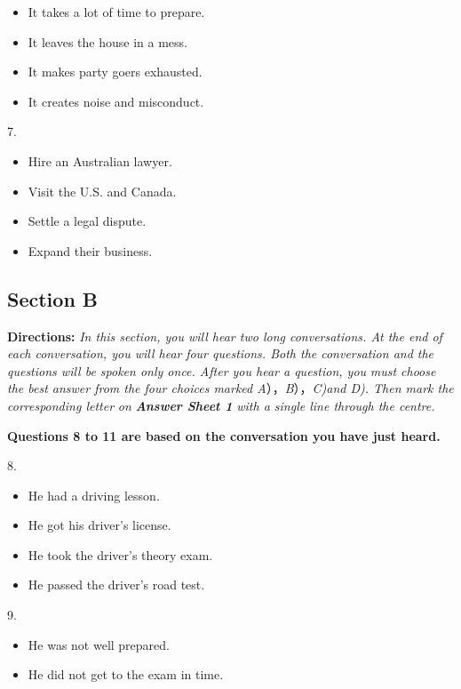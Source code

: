 \documentclass[UTF8,11pt]{ctexart}
\begin{document}
\begin{itemize}[leftmargin=2em,itemsep=.2em,topsep=.4em]\item[A.] It takes a lot of time to prepare.
\item[B.] It leaves the house in a mess.
\item[C.] It makes party goers exhausted.
\item[D.] It creates noise and misconduct.
\end{itemize}

7.


\begin{itemize}[leftmargin=2em,itemsep=.2em,topsep=.4em]\item[A.] Hire an Australian lawyer.
\item[B.] Visit the U.S. and Canada.
\item[C.] Settle a legal dispute.
\item[D.] Expand their business.
\end{itemize}

\subsection*{\textbf{Section B}}


\textbf{Directions:}\textit{ In this section, you will hear two long conversations. At the end of each conversation, you will hear} \textit{four questions. Both the conversation and the questions will be spoken only once. After you hear a question, you} \textit{must choose the best answer from the four choices marked A}），\textit{B}），\textit{C)and D). Then mark the corresponding letter} \textit{on}\textbf{\textit{ Answer Sheet 1}}\textit{ with a single line through the centre.}


\textbf{Questions 8 to 11 are based on the conversation you have just heard.}


8.


\begin{itemize}[leftmargin=2em,itemsep=.2em,topsep=.4em]\item[A.] He had a driving lesson.
\item[B.] He got his driver’s license.
\item[C.] He took the driver’s theory exam.
\item[D.] He passed the driver’s road test.
\end{itemize}

9.


\begin{itemize}[leftmargin=2em,itemsep=.2em,topsep=.4em]\item[A.] He was not well prepared.
\item[B.] He did not get to the exam in time.
\end{itemize}
\end{document}
